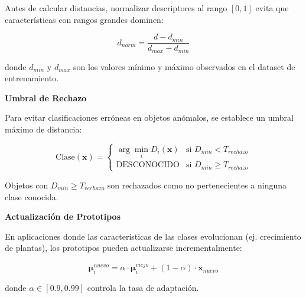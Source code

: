 Antes de calcular distancias, normalizar descriptores al rango $[0,1]$ evita que características con rangos grandes dominen:

\begin{equation}
d_{norm} = \frac{d - d_{min}}{d_{max} - d_{min}}
\end{equation}

donde $d_{min}$ y $d_{max}$ son los valores mínimo y máximo observados en el dataset de entrenamiento.

\textbf{Umbral de Rechazo}

Para evitar clasificaciones erróneas en objetos anómalos, se establece un umbral máximo de distancia:

\begin{equation}
\text{Clase}(\mathbf{x}) = \begin{cases}
\arg\min_{i} D_i(\mathbf{x}) & \text{si } D_{min} < T_{rechazo} \\
\text{DESCONOCIDO} & \text{si } D_{min} \geq T_{rechazo}
\end{cases}
\end{equation}

Objetos con $D_{min} \geq T_{rechazo}$ son rechazados como no pertenecientes a ninguna clase conocida.

\textbf{Actualización de Prototipos}

En aplicaciones donde las características de las clases evolucionan (ej. crecimiento de plantas), los prototipos pueden actualizarse incrementalmente:

\begin{equation}
\boldsymbol{\mu}_i^{nuevo} = \alpha \cdot \boldsymbol{\mu}_i^{viejo} + (1-\alpha) \cdot \mathbf{x}_{nuevo}
\end{equation}

donde $\alpha \in [0.9, 0.99]$ controla la tasa de adaptación.
